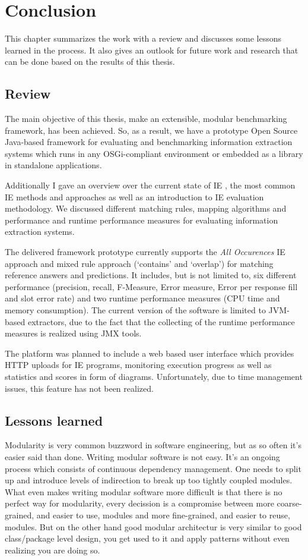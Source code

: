 \section{Conclusion}
\label{sec:conclusion}
This chapter summarizes the work with a review and discusses some lessons learned in the process. It also gives an outlook for future work and research that can be done based on the results of this thesis.

\subsection{Review}
The main objective of this thesis, make an extensible, modular benchmarking framework, has been achieved. So, as a result, we have a prototype Open Source Java-based framework for evaluating and benchmarking information extraction systems which runs in any \gls{OSGi}-compliant environment or embedded as a library in standalone applications.

Additionally I gave an overview over the current state of \gls{IE} , the most common \gls{IE} methods and approaches as well as an introduction to \gls{IE} evaluation methodology. We discussed different matching rules, mapping algorithms and performance and runtime performance measures for evaluating information extraction systems.

The delivered framework prototype currently supports the \textit{All Occurences} \gls{IE} approach and mixed rule approach (\enquote*{contains} and \enquote*{overlap}) for matching reference answers and predictions. It includes, but is not limited to, six different performance (precision, recall, F-Measure, Error measure, Error per response fill and slot error rate) and two runtime performance measures (CPU time and memory consumption). The current version of the software is limited to \gls{JVM}-based extractors, due to the fact that the collecting of the runtime performance measures is realized using \acs{JMX} tools.

The platform was planned to include a web based user interface which provides HTTP uploads for IE programs, monitoring execution progress as well as statistics and scores in form of diagrams. Unfortunately, due to time management issues, this feature has not been realized.

\subsection{Lessons learned}
Modularity is very common buzzword in software engineering, but as so often it's easier said than done. Writing modular software is not easy. It's an ongoing process which consists of continuous dependency management. One needs to split up and introduce levels of indirection to break up too tightly coupled modules. What even makes writing modular software more difficult is that there is no perfect way for modularity, every decission is a compromise between more coarse-grained, and easier to use, modules and more fine-grained, and easier to reuse, modules.  But on the other hand good modular architectur is very similar to good class/package level design, you get used to it and apply patterns without even realizing you are doing so.

